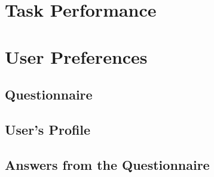 \chapter{Task Performance}


\chapter{User Preferences}

\section{Questionnaire}
\label{appendix_questionnaire}

\begin{center}

\end{center}

\section{User's Profile}

\section{Answers from the Questionnaire}